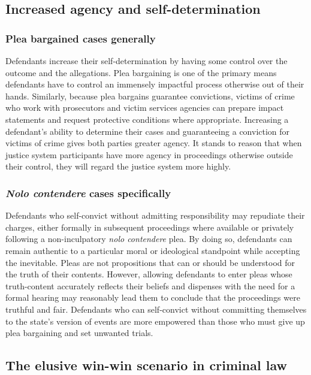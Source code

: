 \subsection{Increased agency and self-determination}

\subsubsection{Plea bargained cases generally}

Defendants increase their self-determination by having some control over the outcome and the allegations. Plea bargaining is one of the primary means defendants have to control an immensely impactful process otherwise out of their hands. Similarly, because plea bargains guarantee convictions, victims of crime who work with prosecutors and victim services agencies can prepare impact statements and request protective conditions where appropriate. Increasing a defendant's ability to determine their cases and guaranteeing a conviction for victims of crime gives both parties greater agency. It stands to reason that when justice system participants have more agency in proceedings otherwise outside their control, they will regard the justice system more highly.

\subsubsection{\textit{Nolo contendere} cases specifically}

Defendants who self-convict without admitting responsibility may repudiate their charges, either formally in subsequent proceedings where available or privately following a non-inculpatory \textit{nolo contendere} plea. By doing so, defendants can remain authentic to a particular moral or ideological standpoint while accepting the inevitable. Pleas are not propositions that can or should be understood for the truth of their contents. However, allowing defendants to enter pleas whose truth-content accurately reflects their beliefs and dispenses with the need for a formal hearing may reasonably lead them to conclude that the proceedings were truthful and fair. Defendants who can self-convict without committing themselves to the state's version of events are more empowered than those who must give up plea bargaining and set unwanted trials.

\subsection{The elusive win-win scenario in criminal law}

